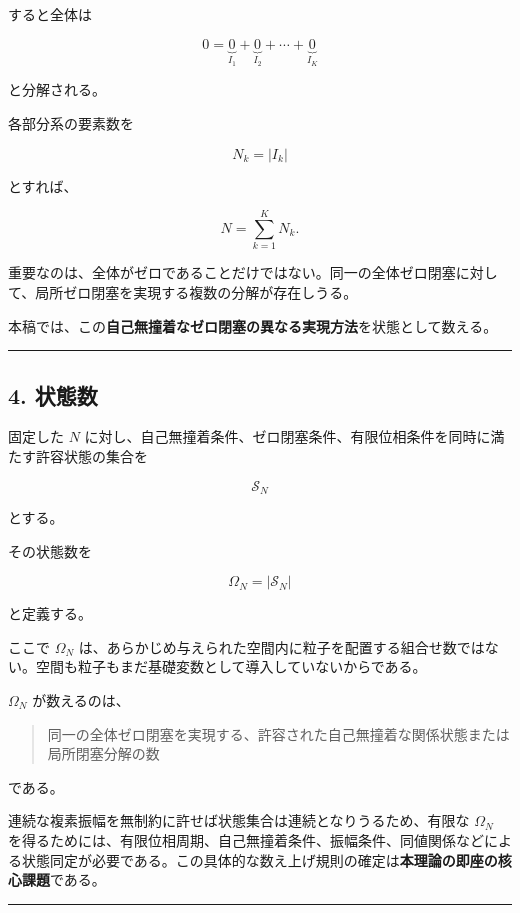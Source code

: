 \documentclass[
  a4paper,
]{ltjsarticle}
\begin{document}
すると全体は

\[
0
=
\underbrace{0}_{I_1}
+
\underbrace{0}_{I_2}
+\cdots+
\underbrace{0}_{I_K}
\tag{5}
\]

と分解される。

各部分系の要素数を

\[
N_k=|I_k|
\]

とすれば、

\[
N=\sum_{k=1}^{K}N_k.
\tag{6}
\]

重要なのは、全体がゼロであることだけではない。同一の全体ゼロ閉塞に対して、局所ゼロ閉塞を実現する複数の分解が存在しうる。

本稿では、この\textbf{自己無撞着なゼロ閉塞の異なる実現方法}を状態として数える。

\begin{center}\rule{0.5\linewidth}{0.5pt}\end{center}

\subsection{4. 状態数}\label{ux72b6ux614bux6570}

固定した \(N\)
に対し、自己無撞着条件、ゼロ閉塞条件、有限位相条件を同時に満たす許容状態の集合を

\[
\mathcal{S}_N
\]

とする。

その状態数を

\[
\Omega_N
=
|\mathcal{S}_N|
\tag{7}
\]

と定義する。

ここで \(\Omega_N\)
は、あらかじめ与えられた空間内に粒子を配置する組合せ数ではない。空間も粒子もまだ基礎変数として導入していないからである。

\(\Omega_N\) が数えるのは、

\begin{quote}
同一の全体ゼロ閉塞を実現する、許容された自己無撞着な関係状態または局所閉塞分解の数
\end{quote}

である。

連続な複素振幅を無制約に許せば状態集合は連続となりうるため、有限な
\(\Omega_N\)
を得るためには、有限位相周期、自己無撞着条件、振幅条件、同値関係などによる状態同定が必要である。この具体的な数え上げ規則の確定は\textbf{本理論の即座の核心課題}である。

\begin{center}\rule{0.5\linewidth}{0.5pt}\end{center}
\end{document}
